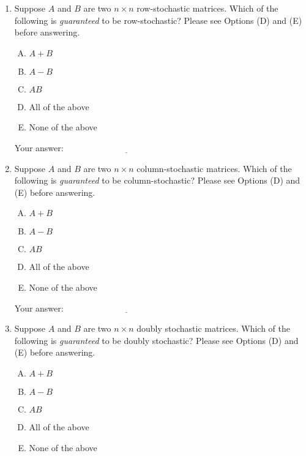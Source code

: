 \documentclass[10pt]{amsart}
\begin{document}
\begin{enumerate}

\item Suppose $A$ and $B$ are two $n \times n$ row-stochastic
  matrices. Which of the following is {\em guaranteed} to be
  row-stochastic? Please see Options (D) and (E) before answering.

  \begin{enumerate}[(A)]
  \item $A + B$
  \item $A - B$
  \item $AB$
  \item All of the above
  \item None of the above
  \end{enumerate}

  \vspace{0.1in}
  Your answer: $\underline{\qquad\qquad\qquad\qquad\qquad\qquad\qquad}$
  \vspace{0.1in}

\item Suppose $A$ and $B$ are two $n \times n$ column-stochastic
  matrices. Which of the following is {\em guaranteed} to be
  column-stochastic? Please see Options (D) and (E) before answering.

  \begin{enumerate}[(A)]
  \item $A + B$
  \item $A - B$
  \item $AB$
  \item All of the above
  \item None of the above
  \end{enumerate}

  \vspace{0.1in}
  Your answer: $\underline{\qquad\qquad\qquad\qquad\qquad\qquad\qquad}$
  \vspace{0.1in}
\item Suppose $A$ and $B$ are two $n \times n$ doubly stochastic
  matrices. Which of the following is {\em guaranteed} to be
  doubly stochastic? Please see Options (D) and (E) before answering.

  \begin{enumerate}[(A)]
  \item $A + B$
  \item $A - B$
  \item $AB$
  \item All of the above
  \item None of the above
  \end{enumerate}


\end{enumerate}
\end{document}
